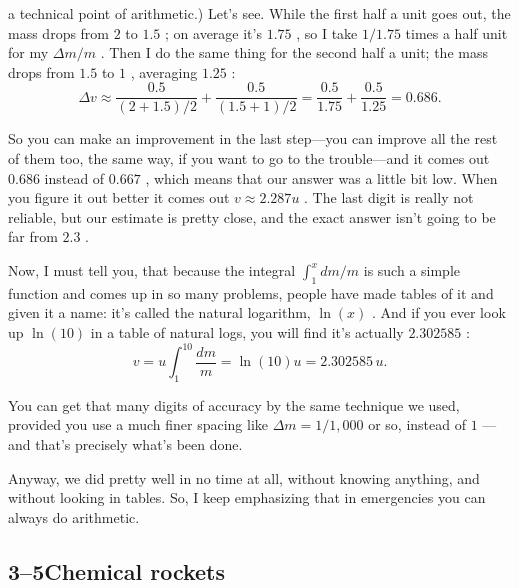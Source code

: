 \documentclass[11pt,oneside]{article}
\begin{document}
a technical point of arithmetic.) Let's see. While the first half a unit goes out, the mass drops from \(2\) to \(1.5\) ; on average it's \(1.75\) , so I take \(1/1.75\) times a half unit for my \(\Delta m/m\) . Then I do the same thing for the second half a unit; the mass drops from \(1.5\) to \(1\) , averaging \(1.25\) : 
\begin{equation*} \Delta v \approx \frac{0.5}{(2+1.5)/2} + \frac{0.5}{(1.5+1)/2} = \frac{0.5}{1.75} + \frac{0.5}{1.25} = 0.686. \end{equation*}
\par

So you can make an improvement in the last step---you can improve all the rest of them too, the same way, if you want to go to the trouble---and it comes out \(0.686\) instead of \(0.667\) , which means that our answer was a little bit low. When you figure it out better it comes out \(v \approx 2.287u\) . The last digit is really not reliable, but our estimate is pretty close, and the exact answer isn't going to be far from \(2.3\) .\par

Now, I must tell you, that because the integral \(\int_1^x dm/m\) is such a simple function and comes up in so many problems, people have made tables of it and given it a name: it's called the natural logarithm, \(\ln(x)\) . And if you ever look up \(\ln(10)\) in a table of natural logs, you will find it's actually \(2.302585\) : 
\begin{equation*} \tag{3.19}
\label{Eq:TIPS:3:19} v = u \int_1^{10} \frac{dm}{m} = \ln(10)u = 2.302585\,u. \end{equation*}
\par

You can get that many digits of accuracy by the same technique we used, provided you use a much finer spacing like \(\Delta m = 1/1,\!000\) or so, instead of \(1\) ---and that's precisely what's been done.\par

Anyway, we did pretty well in no time at all, without knowing anything, and without looking in tables. So, I keep emphasizing that in emergencies you can always do arithmetic.\par

\subsection*{3--5Chemical rockets}
\end{document}
